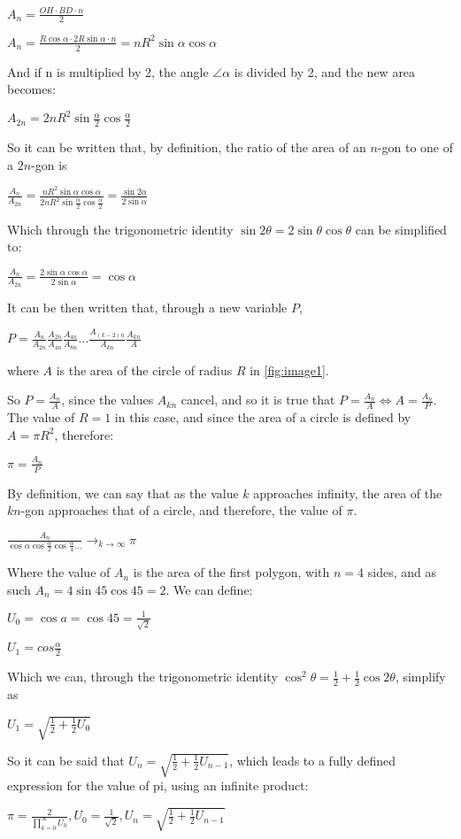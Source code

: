 $A_{n} = \frac{OH \cdot BD \cdot n}{2}$ 

$A_{n} = \frac{R \cos{\alpha} \cdot 2 R \sin{\alpha} \cdot n}{2} = n R^2 \sin{\alpha} \cos{\alpha}$

And if n is multiplied by 2, the angle $\angle \alpha$ is divided by 2, and the new area becomes:

$A_{2n} = 2n R^2 \sin{\frac{\alpha}{2}} \cos{\frac{\alpha}{2}}$

So it can be written that, by definition, the ratio of the area of an $n$-gon to one of a $2n$-gon is

$\frac{A_{n}}{A_{2n}} = \frac{n R^2 \sin{\alpha} \cos{\alpha}}{2 n R^2 \sin{\frac{\alpha}{2}} \cos{\frac{\alpha}{2}}} = \frac{\sin{2 \alpha}}{2 \sin{\alpha}}$

Which through the trigonometric identity $\sin{2 \theta} = 2\sin{\theta} \cos{\theta}$ can be simplified to:

$\frac{A_{n}}{A_{2n}} = \frac{2\sin{\alpha} \cos{\alpha} }{2\sin{\alpha}}  = \cos{\alpha}$

It can be then written that, through a new variable $P$, 

$P = \frac{A_{n}}{A_{2n}} \frac{A_{2n}}{A_{4n}} \frac{A_{4n}}{A_{8n}} \dots \frac{A_{(k-2)n}}{A_{kn}} \frac{A_{kn}}{A}$ 

where $A$ is the area of the circle of radius $R$ in \ref{fig:image1}.

So $P = \frac{A_{n}}{A}$, since the values $A_{kn}$ cancel, and so it is true that $P = \frac{A_{n}}{A} \Leftrightarrow A = \frac{A_{n}}{P}$. The value of $R = 1$ in this case, and since the area of a circle is defined by $A = \pi R^2$, therefore: 

$\pi = \frac{A_{n}}{P}$ 

By definition, we can say that as the value $k$ approaches infinity, the area of the $kn$-gon approaches that of a circle, and therefore, the value of $\pi$.

$\frac{A_{n}}{\cos{\alpha} \cos{\frac{\alpha}{2}} \cos{\frac{\alpha}{4}} \dots}
  \to_{k \to \infty} \pi$

Where the value of $A_{n}$ is the area of the first polygon, with $n=4$ sides, and as such
$A_{n} = 4 \sin{45} \cos{45} = 2$. We can define:

$U_{0} = \cos{a} = \cos{45} = \frac{1}{\sqrt{2}}$ 

$U_{1} = cos{\frac{\alpha}{2}}$ 

Which we can, through the trigonometric identity
$\cos^2{\theta} = \frac{1}{2} + \frac{1}{2} \cos{2\theta}$, simplify as

$U_{1} = \sqrt{\frac{1}{2} + \frac{1}{2} U_{0}}$ 

So it can be said that $U_{n} = \sqrt{\frac{1}{2} + \frac{1}{2} U_{n - 1}}$, which leads to a fully defined expression for the value of pi, using an infinite product:

$\pi = \frac{2}{\prod\limits_{k=0}^\infty U_{k}}, U_{0} = \frac{1}{\sqrt{2}}, U_{n} = \sqrt{\frac{1}{2} + \frac{1}{2} U_{n - 1}}$ \footnotemark



